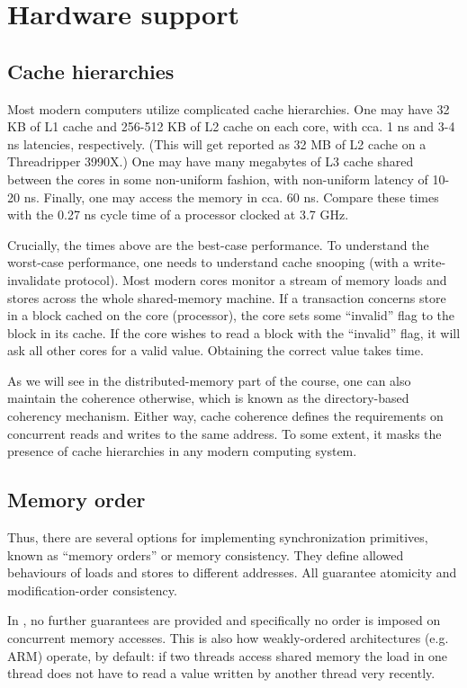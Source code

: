 \section{Hardware support}

\subsection{Cache hierarchies}

Most modern computers utilize complicated cache hierarchies. One may have 32 KB of L1 cache and 256-512 KB of L2 cache on each core, with cca. 1 ns and 3-4 ns latencies, respectively. (This will get reported as 32 MB of L2 cache on a Threadripper 3990X.) One may have many megabytes of L3 cache shared between the cores in some non-uniform fashion, with non-uniform latency of 10-20 ns. Finally, one may access the memory in cca. 60 ns. Compare these times with the 0.27 ns cycle time of a processor clocked at 3.7 GHz. 

Crucially, the times above are the best-case performance. To understand the worst-case performance, one needs to understand cache snooping (with a write-invalidate protocol). Most modern cores monitor a stream of memory loads and stores across the whole shared-memory machine. If a transaction concerns store in a block cached on the core (processor), the core sets some ``invalid'' flag to the block in its cache. If the core wishes to read a block with the ``invalid'' flag, it will ask all other cores for a valid value. Obtaining the correct value takes time. 

As we will see in the distributed-memory part of the course, one can also maintain the coherence otherwise, which is known as the  directory-based coherency mechanism. Either way, cache coherence defines the requirements on concurrent reads and writes to the same address. To some extent, it masks the presence of cache hierarchies in any modern computing system. 

\subsection{Memory order}

Thus, there are several options for implementing synchronization primitives, known as ``memory orders'' or memory consistency. They define allowed behaviours of loads and stores to different addresses.
All guarantee atomicity and modification-order consistency.

In , no further guarantees are provided and specifically no order is imposed on concurrent memory accesses. This is also how weakly-ordered architectures (e.g. ARM) operate, by default: if two threads access shared memory the load in one thread does not have to read a value written by another thread very recently.

